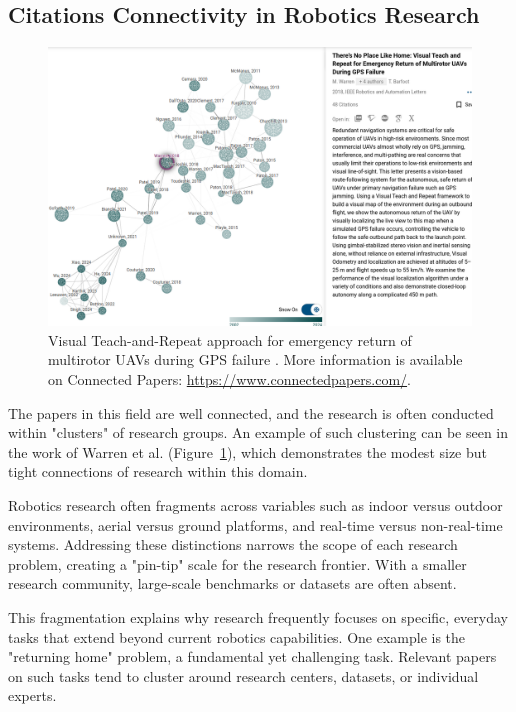 \documentclass[runningheads]{llncs}
\begin{document}
\subsection{Citations Connectivity in Robotics Research}

\begin{figure}[ht]
  \centering
  \includegraphics[width=\linewidth]{img/There_is_no_place_like_home_research_tree.png}
  \caption{Visual Teach-and-Repeat approach for emergency return of multirotor UAVs during GPS failure \protect\cite{warren-ral19-no-place-like-Home}. More information is available on Connected Papers: \protect\url{https://www.connectedpapers.com/}.}
  \label{fig:no_place_like_home}
\end{figure}

The papers in this field are well connected, and the research is often conducted within "clusters" of research groups. An example of such clustering can be seen in the work of Warren et al. (Figure~\ref{fig:no_place_like_home}), which demonstrates the modest size but tight connections of research within this domain.

Robotics research often fragments across variables such as indoor versus outdoor environments, aerial versus ground platforms, and real-time versus non-real-time systems. Addressing these distinctions narrows the scope of each research problem, creating a "pin-tip" scale for the research frontier. With a smaller research community, large-scale benchmarks or datasets are often absent.

This fragmentation explains why research frequently focuses on specific, everyday tasks that extend beyond current robotics capabilities. One example is the "returning home" problem, a fundamental yet challenging task. Relevant papers on such tasks tend to cluster around research centers, datasets, or individual experts.
\end{document}
